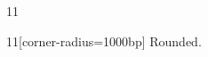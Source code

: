 \documentclass[paper=A4]{ropas-poster}
\begin{document}
\begin{postergrid}{1}{1}
\begin{posterblock}{1}{1}[corner-radius=1000bp]
Rounded.
\end{posterblock}
\end{postergrid}
\end{document}
